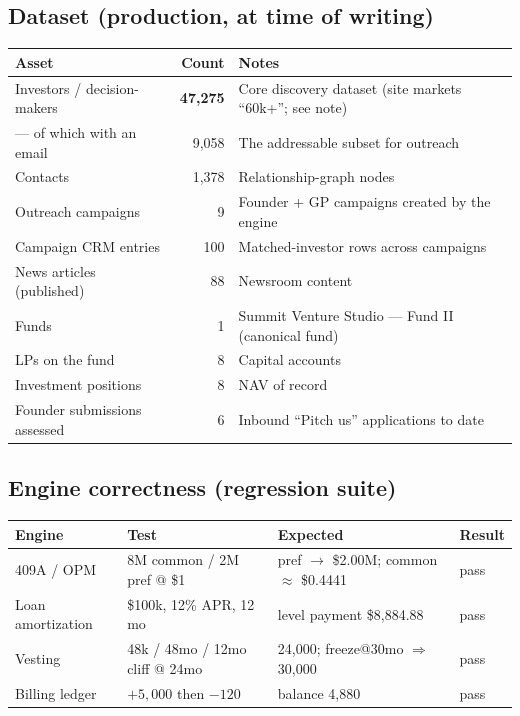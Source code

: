 \documentclass[11pt]{article}
\begin{document}
\subsection{Dataset (production, at time of writing)}
\begin{center}\small
\begin{tabular}{@{}lrl@{}}
\toprule
\textbf{Asset} & \textbf{Count} & \textbf{Notes}\\
\midrule
Investors / decision-makers & \textbf{47{,}275} & Core discovery dataset (site markets ``60k+''; see note)\\
\quad --- of which with an email & 9{,}058 & The addressable subset for outreach\\
Contacts & 1{,}378 & Relationship-graph nodes\\
Outreach campaigns & 9 & Founder + GP campaigns created by the engine\\
Campaign CRM entries & 100 & Matched-investor rows across campaigns\\
News articles (published) & 88 & Newsroom content\\
Funds & 1 & Summit Venture Studio --- Fund II (canonical fund)\\
LPs on the fund & 8 & Capital accounts\\
Investment positions & 8 & NAV of record\\
Founder submissions assessed & 6 & Inbound ``Pitch us'' applications to date\\
\bottomrule
\end{tabular}
\end{center}

\subsection{Engine correctness (regression suite)}
\begin{center}\small
\begin{tabular}{@{}llll@{}}
\toprule
\textbf{Engine} & \textbf{Test} & \textbf{Expected} & \textbf{Result}\\
\midrule
409A / OPM & 8M common / 2M pref @ \$1 & pref $\to$ \$2.00M; common $\approx$ \$0.4441 & pass\\
Loan amortization & \$100k, 12\% APR, 12 mo & level payment \$8{,}884.88 & pass\\
Vesting & 48k / 48mo / 12mo cliff @ 24mo & 24{,}000; freeze@30mo $\Rightarrow$ 30{,}000 & pass\\
Billing ledger & $+5{,}000$ then $-120$ & balance 4{,}880 & pass\\
\bottomrule
\end{tabular}
\end{center}
\end{document}
